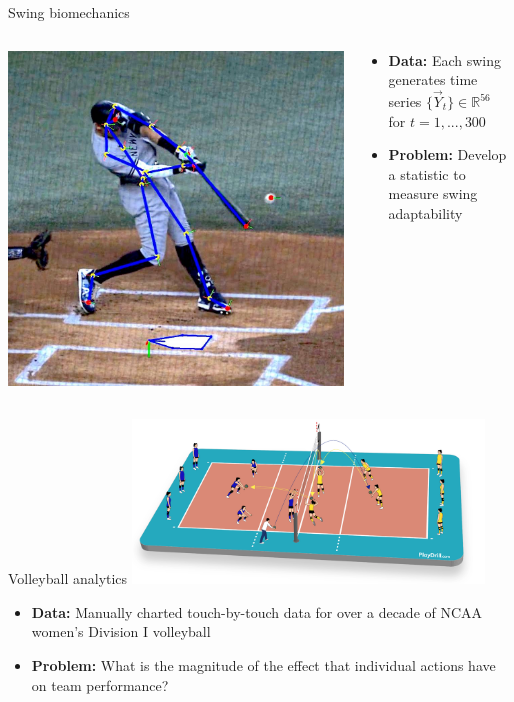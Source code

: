\documentclass[handout]{beamer}
\def\mR{\mathbb R}\def\mS{\mathbb S}
\begin{document}
\begin{frame}{Swing biomechanics}
  \begin{columns}
    \begin{column}{0.4\textwidth}
      \includegraphics[width = \textwidth]{images/swing_biomechanics.jpeg}
    \end{column}
    \begin{column}{0.6\textwidth}
      \begin{itemize}
        \item {\bf Data:} Each swing generates time series $\{\vec Y_t\} \in \mR^{56}$ for $t = 1, ..., 300$
        \item {\bf Problem:} Develop a statistic to measure swing adaptability
      \end{itemize}
    \end{column}
  \end{columns}
\end{frame}

\begin{frame}{Volleyball analytics}
  \centering
  \includegraphics[width = 0.7\textwidth]{images/volleyball.png}
  \begin{itemize}
    \item {\bf Data:} Manually charted touch-by-touch data for over a decade of NCAA women's Division I volleyball
    \item {\bf Problem:} What is the magnitude of the effect that individual actions have on team performance?
  \end{itemize}
\end{frame}
\end{document}

